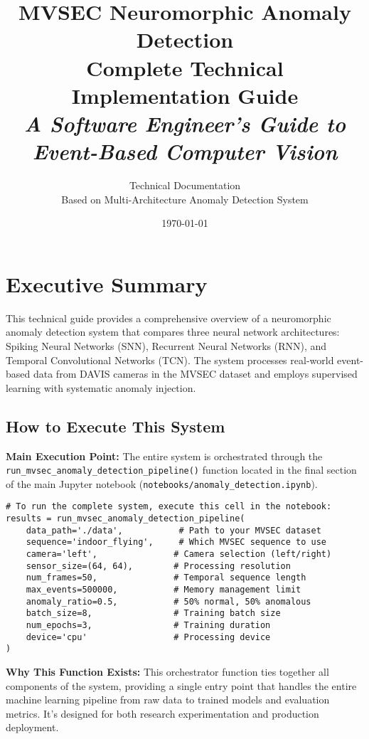 \documentclass[12pt,a4paper]{article}
\title{\textbf{\Huge MVSEC Neuromorphic Anomaly Detection} \\ \vspace{0.5cm} \textbf{\Large Complete Technical Implementation Guide} \\ \vspace{0.3cm} \textit{A Software Engineer's Guide to Event-Based Computer Vision}}
\author{Technical Documentation \\ Based on Multi-Architecture Anomaly Detection System}
\date{\today}
\begin{document}
\maketitle
\tableofcontents
\newpage

\section{Executive Summary}

This technical guide provides a comprehensive overview of a neuromorphic anomaly detection system that compares three neural network architectures: Spiking Neural Networks (SNN), Recurrent Neural Networks (RNN), and Temporal Convolutional Networks (TCN). The system processes real-world event-based data from DAVIS cameras in the MVSEC dataset and employs supervised learning with systematic anomaly injection.

\subsection{How to Execute This System}

\textbf{Main Execution Point:} The entire system is orchestrated through the \texttt{run\_mvsec\_anomaly\_detection\_pipeline()} function located in the final section of the main Jupyter notebook (\texttt{notebooks/anomaly\_detection.ipynb}).

\begin{lstlisting}[caption={Primary Execution Command}]
# To run the complete system, execute this cell in the notebook:
results = run_mvsec_anomaly_detection_pipeline(
    data_path='./data',           # Path to your MVSEC dataset
    sequence='indoor_flying',     # Which MVSEC sequence to use
    camera='left',               # Camera selection (left/right)
    sensor_size=(64, 64),        # Processing resolution
    num_frames=50,               # Temporal sequence length
    max_events=500000,           # Memory management limit
    anomaly_ratio=0.5,           # 50% normal, 50% anomalous
    batch_size=8,                # Training batch size
    num_epochs=3,                # Training duration
    device='cpu'                 # Processing device
)
\end{lstlisting}

\textbf{Why This Function Exists:} This orchestrator function ties together all components of the system, providing a single entry point that handles the entire machine learning pipeline from raw data to trained models and evaluation metrics. It's designed for both research experimentation and production deployment.
\end{document}
